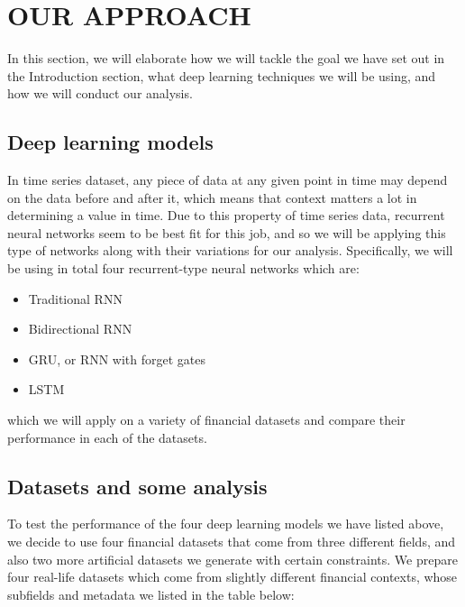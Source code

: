 \documentclass[letterpaper, 10 pt, conference]{ieeeconf}  %
\begin{document}
\section{OUR APPROACH}
In this section, we will elaborate how we will tackle the goal we have set out in the Introduction section, what deep learning techniques we will be using, and how we will conduct our analysis.

\subsection{Deep learning models}
    In time series dataset, any piece of data at any given point in time may depend on the data before and after it, which means that context matters a lot in determining a value in time. Due to this property of time series data, recurrent neural networks seem to be best fit for this job, and so we will be applying this type of networks along with their variations for our analysis. Specifically, we will be using in total four recurrent-type neural networks which are: 
    \begin{itemize}
        \item Traditional RNN
        \item Bidirectional RNN
        \item GRU, or RNN with forget gates
        \item LSTM
    \end{itemize}
    which we will apply on a variety of financial datasets and compare their performance in each of the datasets.

\subsection{Datasets and some analysis}
    To test the performance of the four deep learning models we have listed above, we decide to use four financial datasets that come from three different fields, and also two more artificial datasets we generate with certain constraints. We prepare four real-life datasets which come from slightly different financial contexts, whose subfields and metadata we listed in the table below:
\end{document}
